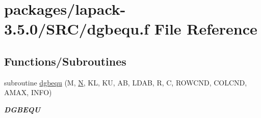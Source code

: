 \hypertarget{dgbequ_8f}{}\section{packages/lapack-\/3.5.0/\+S\+R\+C/dgbequ.f File Reference}
\label{dgbequ_8f}
\subsection*{Functions/\+Subroutines}
\begin{DoxyCompactItemize}
\item 
subroutine \hyperlink{group__doubleGBcomputational_gaa5c4d4757c088ae38c54a8ac0a2fcac2}{dgbequ} (M, \hyperlink{polmisc_8c_a0240ac851181b84ac374872dc5434ee4}{N}, K\+L, K\+U, A\+B, L\+D\+A\+B, R, C, R\+O\+W\+C\+N\+D, C\+O\+L\+C\+N\+D, A\+M\+A\+X, I\+N\+F\+O)
\begin{DoxyCompactList}\small\item\em {\bfseries D\+G\+B\+E\+Q\+U} \end{DoxyCompactList}\end{DoxyCompactItemize}
